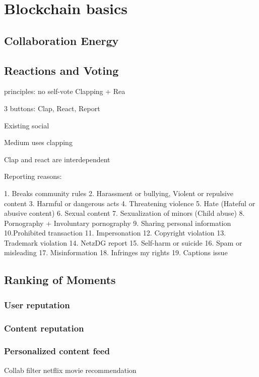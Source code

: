 \documentclass[a4paper]{article}
\begin{document}
\section{Blockchain basics}
\subsection{Collaboration Energy}

\subsection{Reactions and Voting}
principles: no self-vote
Clapping + Rea

3 buttons:
Clap, React, Report

Existing social 

Medium uses clapping

Clap and react are interdependent


Reporting reasons:
\begin{enumerate}
1. Breaks community rules 2. Harassment or bullying, Violent or repulsive content
3. Harmful or dangerous acts 4. Threatening violence 5. Hate (Hateful or abusive content)
6. Sexual content 7. Sexualization of minors (Child abuse) 8. Pornography + Involuntary pornography
9. Sharing personal information 10.Prohibited transaction
11. Impersonation 12. Copyright violation 13. Trademark violation
14. NetzDG report 15. Self-harm or suicide 16. Spam or misleading
17. Misinformation 18. Infringes my rights 19. Captions issue
\end{enumerate}


\subsection{Ranking of Moments}

\subsubsection{User reputation}

\subsubsection{Content reputation}

\subsubsection{Personalized content feed}
Collab filter netflix movie recommendation
\end{document}
